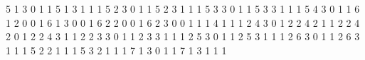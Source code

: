    {5}  {1} {3} {0} {1} {1}   %
   {5}  {1} {3} {1} {1} {1}   %
   {5}  {2} {3} {0} {1} {1}   %
   {5}  {2} {3} {1} {1} {1}   %
   {5}  {3} {3} {0} {1} {1}   %
   {5}  {3} {3} {1} {1} {1}   %
  {5}  {4} {3} {0} {1} {1}   %
   {6}  {1} {2} {0} {0} {1}   %
   {6}  {1} {3} {0} {0} {1}   %
   {6}  {2} {2} {0} {0} {1}   %
  {6}  {2} {3} {0} {0} {1}   %
   {1}  {1} {4} {1} {1} {1}   %
   {2}  {4} {3} {0} {1} {2}   %
   {2}  {4} {2} {1} {1} {2}   %
   {2}  {4} {2} {0} {1} {2}   %
   {2}  {4} {3} {1} {1} {2}   %
   {2}  {3} {3} {0} {1} {1}   %
   {2}  {3} {3} {1} {1} {1}   %
   {2}  {5} {3} {0} {1} {1}   %
   {2}  {5} {3} {1} {1} {1}   %
   {2}  {6} {3} {0} {1} {1}   %
   {2}  {6} {3} {1} {1} {1}   %
  {5}  {2} {2} {1} {1} {1}   %
  {5}  {3} {2} {1} {1} {1}   %
   {7}  {1} {3} {0} {1} {1}   %
   {7}  {1} {3} {1} {1} {1}   %
